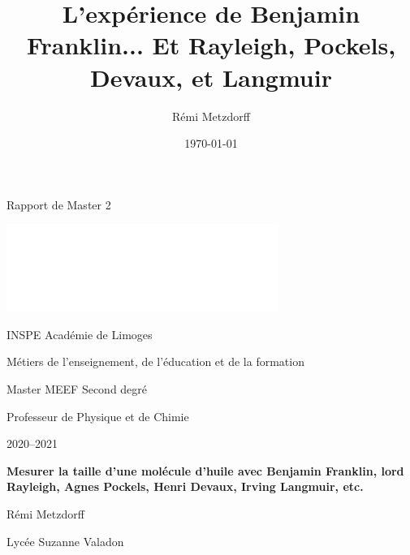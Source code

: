 \documentclass[12pt,a4paper]{article}
\title{L'expérience de Benjamin Franklin... Et Rayleigh, Pockels, Devaux, et Langmuir}
\author{Rémi Metzdorff}
\date{\today}
\newenvironment{header}
{%
	\addcontentsline{ldf}{figure}{0}%
	\begin{header_env}\qquad\Large\bf}
	{\end{header_env}}
\begin{document}

\begin{header}
\begin{minipage}{0.55\textwidth}
Rapport de Master 2
\end{minipage}
\begin{minipage}{0.38\textwidth}
\href{https://www.unilim.fr/}{\includegraphics[scale=1]{logo.png}}
\end{minipage}
\end{header}

\vspace{30pt}
\begin{spacing}{1.2}
{\bf
\begin{Large}
\noindent
\textcolor{gray_unilim}{INSPE Académie de Limoges}
\end{Large}

\begin{large}
\noindent
\textcolor{gray_unilim}{Métiers de l'enseignement, de l'éducation et de la formation}

\noindent
\textcolor{orange_unilim}{Master MEEF Second degré}

\noindent
\textcolor{orange_unilim}{Professeur de Physique et de Chimie}
\end{large}
}

\vspace{20pt}

\noindent
\textcolor{gray_unilim}{2020--2021}

\vspace{40pt}
\begin{large}
\bf
\noindent
\textcolor{orange_unilim}{Mesurer la taille d'une molécule d'huile avec Benjamin Franklin, lord Rayleigh, Agnes Pockels,  Henri Devaux, Irving Langmuir, etc.}

\vspace{150pt}
\noindent
\textcolor{gray_unilim}{Rémi Metzdorff}

\noindent
\textcolor{orange_unilim}{Lycée Suzanne Valadon}
\end{large}
\end{spacing}
\end{document}
